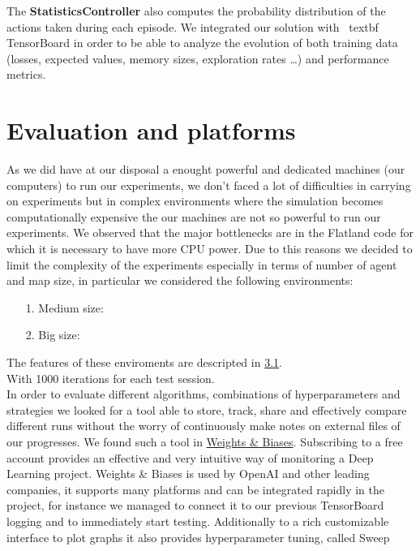The \textbf{StatisticsController} also computes the probability distribution of the actions taken during each episode.
We integrated our solution with \ textbf {TensorBoard} in order to be able to analyze the evolution of both training data (losses, expected values, memory sizes, exploration rates \ldots) and performance metrics.
\section{Evaluation and platforms}
As we did have at our disposal a enought powerful and dedicated machines (our computers) to run our experiments, we don't faced a lot of difficulties in carrying on experiments but in complex environments where the simulation becomes computationally expensive the our machines are not so powerful to run our experiments.
We observed that the major bottlenecks are in the Flatland code for which it is necessary to have more CPU power.
Due to this reasons we decided to limit the complexity of the experiments especially in terms of number of agent and map size, in particular we considered the following environments:
\begin{enumerate}
	\item [1.] Medium size:
	\item [2.] Big size:
\end{enumerate}
The features of these enviroments are descripted in \hyperref[sec:ourParameters]{3.1}.\\
With 1000 iterations for each test session. \\
In order to evaluate different algorithms, combinations of hyperparameters and strategies we looked for a tool able to store, track, share and effectively compare different runs without the worry of continuously make notes on external files of our progresses.
We found such a tool in \href{https://www.wandb.com/}{Weights \& Biases}.
Subscribing to a free account provides an effective and very intuitive way of monitoring a Deep Learning project.
Weights \& Biases is used by OpenAI and other leading companies, it supports many platforms and can be integrated rapidly in the project, for instance we managed to connect it to our previous TensorBoard logging and to immediately start testing.
Additionally to a rich customizable interface to plot graphs it also provides hyperparameter tuning, called Sweep
